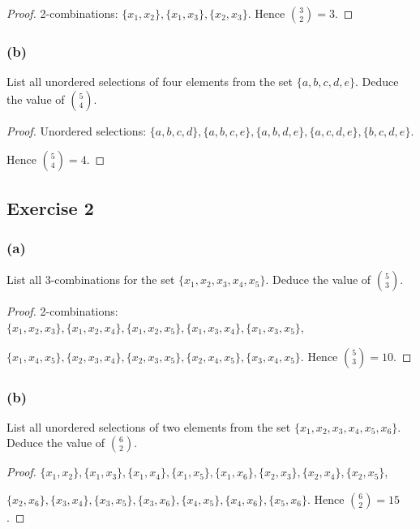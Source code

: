 \documentclass[14pt]{extarticle}
\begin{document}
\begin{proof}
2-combinations: \(\{x_1, x_2\}, \{x_1, x_3\}, \{x_2, x_3\}\). Hence \(\binom{3}{2} = 3\).
\end{proof}

\subsubsection{(b)}
List all unordered selections of four elements from the set \(\{a, b, c, d,e\}\). Deduce the value of \(\binom{5}{4}\).

\begin{proof}
Unordered selections: \(\{a,b,c,d\}, \{a,b,c,e\}, \{a,b,d,e\}, \{a,c,d,e\}, \{b,c,d,e\}\). 

Hence \(\binom{5}{4} = 4\).
\end{proof}

\subsection{Exercise 2}
\subsubsection{(a)}
List all 3-combinations for the set \(\{x_1, x_2, x_3, x_4, x_5\}\). Deduce the value of \(\binom{5}{3}\).

\begin{proof}
2-combinations: \(\{x_1, x_2, x_3\}, \{x_1, x_2, x_4\}, \{x_1, x_2, x_5\}, \{x_1, x_3, x_4\}, \{x_1, x_3, x_5\},\) 

\(\{x_1, x_4, x_5\}, \{x_2, x_3, x_4\}, \{x_2, x_3, x_5\}, \{x_2, x_4, x_5\}, \{x_3, x_4, x_5\}\). 
Hence \(\binom{5}{3} = 10\).
\end{proof}

\subsubsection{(b)}
List all unordered selections of two elements from the set \(\{x_1, x_2, x_3, x_4, x_5, x_6\}\). 
Deduce the value of \(\binom{6}{2}\).

\begin{proof}
\(\{x_1, x_2\}, \{x_1, x_3\}, \{x_1, x_4\}, \{x_1, x_5\}, \{x_1, x_6\}, \{x_2, x_3\}, \{x_2, x_4\}, \{x_2, x_5\}\),

\(\{x_2, x_6\}, \{x_3, x_4\}, \{x_3, x_5\}, \{x_3, x_6\}, \{x_4, x_5\}, \{x_4, x_6\}, \{x_5, x_6\}\). 
Hence \(\binom{6}{2} = 15\).
\end{proof}
\end{document}
